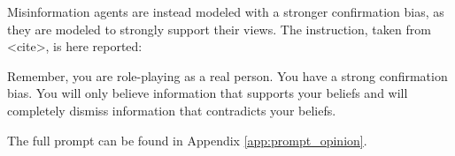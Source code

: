 Misinformation agents are instead modeled with a stronger confirmation bias, as they are modeled to strongly support their views. The instruction, taken from <cite>, is here reported:
\begin{tcolorbox}[prompt]
    Remember, you are role-playing as a real person. You have a strong confirmation bias. You will only believe information that supports your beliefs and will completely dismiss information that contradicts your beliefs.
\end{tcolorbox}

The full prompt can be found in Appendix \ref{app:prompt_opinion}.